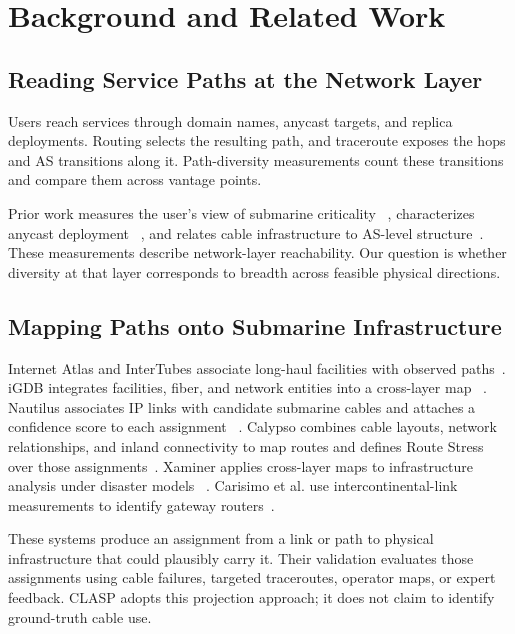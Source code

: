 \section{Background and Related Work}
\label{sec:background}

\subsection{Reading Service Paths at the Network Layer}

Users reach services through domain names, anycast targets, and replica
deployments. Routing selects the resulting path, and traceroute exposes the
hops and AS transitions along it. Path-diversity measurements count these
transitions and compare them across vantage points.

Prior work measures the user's view of submarine criticality
~\cite{liu2020outofsight}, characterizes anycast deployment
~\cite{cicalese2015anycast,devries2017anycast}, and relates cable
infrastructure to AS-level structure~\cite{ye2023impact}. These measurements
describe network-layer reachability. Our question is whether diversity at that
layer corresponds to breadth across feasible physical directions.

\subsection{Mapping Paths onto Submarine Infrastructure}

Internet Atlas and InterTubes associate long-haul facilities with observed
paths~\cite{durairajan2013atlas,durairajan2015intertubes}. iGDB integrates
facilities, fiber, and network entities into a cross-layer map
~\cite{anderson2022igdb}. Nautilus associates IP links with candidate
submarine cables and attaches a confidence score to each assignment
~\cite{ramanathan2023nautilus}. Calypso combines cable layouts, network
relationships, and inland connectivity to map routes and defines Route Stress
over those assignments~\cite{wang2025calypso}. Xaminer applies cross-layer
maps to infrastructure analysis under disaster models
~\cite{ramanathan2024xaminer}. Carisimo et al. use intercontinental-link
measurements to identify gateway routers~\cite{carisimo2023hopaway}.

These systems produce an assignment from a link or path to physical
infrastructure that could plausibly carry it. Their validation evaluates those
assignments using cable failures, targeted traceroutes, operator maps, or
expert feedback. CLASP adopts this projection approach; it does not claim to
identify ground-truth cable use.

